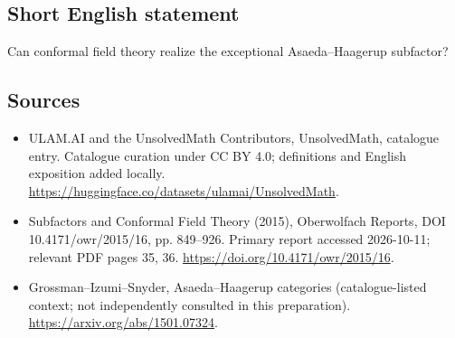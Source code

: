 \documentclass[11pt]{article}
\begin{document}
\subsection{Short English statement}
Can conformal field theory realize the exceptional Asaeda--Haagerup subfactor?
\subsection{Sources}
\begin{itemize}
\item[\hypertarget{source:statement:1}{S1}] ULAM.AI and the UnsolvedMath Contributors, UnsolvedMath, catalogue entry. Catalogue curation under CC BY 4.0; definitions and English exposition added locally.
\url{https://huggingface.co/datasets/ulamai/UnsolvedMath}.
\item[\hypertarget{source:statement:2}{S2}] Subfactors and Conformal Field Theory (2015), Oberwolfach Reports, DOI 10.4171/owr/2015/16, pp. 849--926. Primary report accessed 2026-10-11; relevant PDF pages 35, 36.
\url{https://doi.org/10.4171/owr/2015/16}.
\item[\hypertarget{source:statement:3}{S3}] Grossman--Izumi--Snyder, Asaeda--Haagerup categories (catalogue-listed context; not independently consulted in this preparation).
\url{https://arxiv.org/abs/1501.07324}.
\end{itemize}
\label{end:statement}
\end{document}
